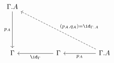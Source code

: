 \[\begin{tikzcd}
	{\Gamma.A} \\
	\\
	\\
	\Gamma && \Gamma && {\Gamma.A}
	\arrow["{\id_{\Gamma}}", from=4-3, to=4-1]
	\arrow["{p_{A}}", from=4-5, to=4-3]
	\arrow["{p_{A}}"', from=1-1, to=4-1]
	\arrow["{(p_{A}, q_{A}) = \id_{\Gamma.A}}"', dashed, from=4-5, to=1-1]
\end{tikzcd}\]